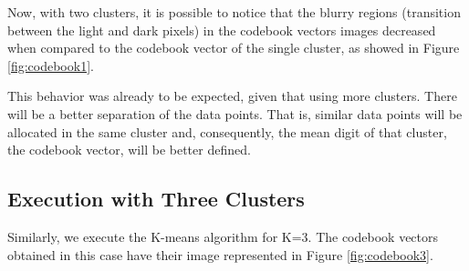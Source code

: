 \documentclass{article}
\begin{document}
Now, with two clusters, it is possible to notice that the blurry regions (transition between the light and dark pixels) in the codebook vectors images decreased when compared to the codebook vector of the single cluster, as showed in Figure \ref{fig:codebook1}.

This behavior was already to be expected, given that using more clusters. There will be a better separation of the data points. That is, similar data points will be allocated in the same cluster and, consequently, the mean digit of that cluster, the codebook vector, will be better defined.

\subsection{Execution with Three Clusters}

Similarly, we execute the K-means algorithm for K=3. The codebook vectors obtained in this case have their image represented in Figure \ref{fig:codebook3}.
\end{document}
